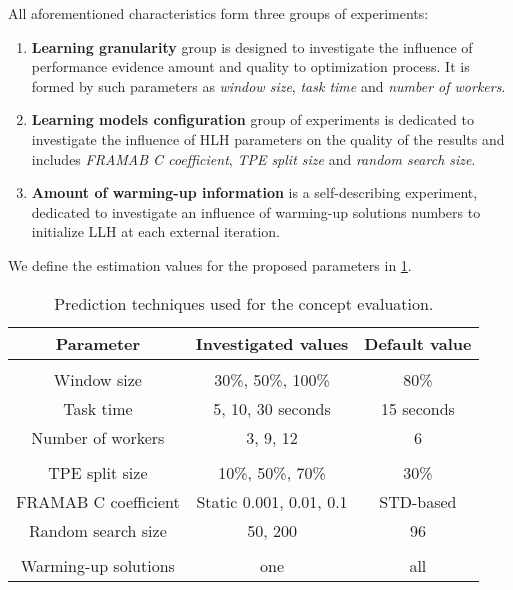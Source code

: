 All aforementioned characteristics form three groups of experiments:
\begin{enumerate}
	\item \textbf{Learning granularity} group is designed to investigate the influence of performance evidence amount and quality to optimization process. It is formed by such parameters as \emph{window size}, \emph{task time} and \emph{number of workers}.
	
	\item \textbf{Learning models configuration} group of experiments is dedicated to investigate the influence of HLH parameters on the quality of the results and includes \emph{FRAMAB C coefficient}, \emph{TPE split size} and \emph{random search size}.
	
	\item \textbf{Amount of warming-up information} is a self-describing experiment, dedicated to investigate an influence of warming-up solutions numbers to initialize LLH at each external iteration.
\end{enumerate}

We define the estimation values for the proposed parameters in \cref{eval:2: planning table}.

\begin{table}[h!]
	\centering
	\begin{tabular}{ccc}
		\hline
		\textbf{Parameter} & \textbf{Investigated values} & \textbf{Default value} \\
		\hline
		\rowcolor{gray!10}
		\multicolumn{3}{c}{\textit{Learning granularity}} \\
		Window size & 30\%, 50\%, 100\% & 80\% \\
		Task time & 5, 10, 30 seconds & 15 seconds \\
		Number of workers & 3, 9, 12 & 6 \\
		\rowcolor{gray!10}
		\multicolumn{3}{c}{\textit{Learning models configuration}} \\
		TPE split size & 10\%, 50\%, 70\% & 30\% \\
		FRAMAB C coefficient & Static 0.001, 0.01, 0.1 & STD-based \\
		Random search size & 50, 200 & 96 \\
		\rowcolor{gray!10}
		\multicolumn{3}{c}{\textit{Amount of warming-up information}} \\
		Warming-up solutions & one & all \\
		\hline
	\end{tabular}
	\caption{Prediction techniques used for the concept evaluation.}
	\label{eval:2: planning table}
\end{table}

